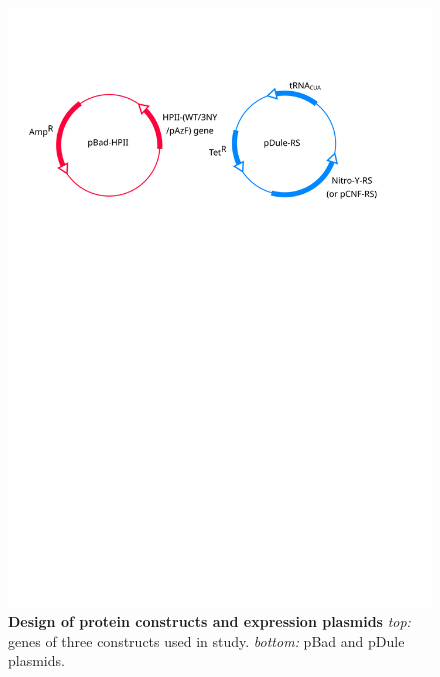 \documentclass[9pt,twocolumn,twoside]{pnas-new}
\begin{document}
\begin{figure}
  \includegraphics[width=\linewidth]{figures/plasmid-diagram}
  \caption{\textbf{Design of protein constructs and expression plasmids} \textit{top:} genes of three constructs used in study. \textit{bottom:} pBad and pDule plasmids.}
  \label{fig:design}
\end{figure}
\end{document}
